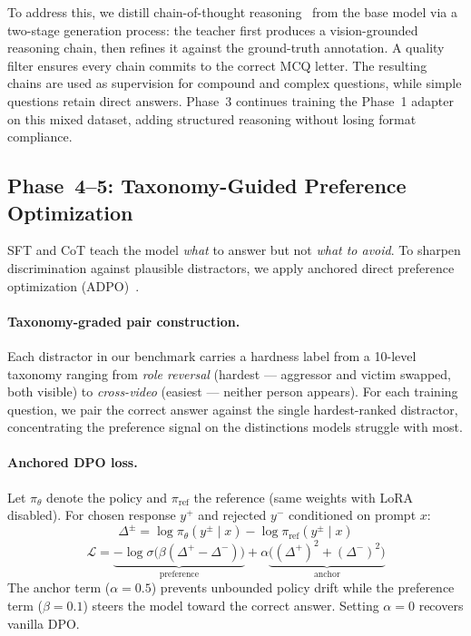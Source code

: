 To address this, we distill chain-of-thought
reasoning~\cite{wei2022chain} from the base model via a two-stage
generation process: the teacher first produces a vision-grounded reasoning
chain, then refines it against the ground-truth annotation.
A quality filter ensures every chain commits to the correct MCQ letter.
The resulting chains are used as supervision for compound and complex
questions, while simple questions retain direct answers.
Phase~3 continues training the Phase~1 adapter on this mixed dataset,
adding structured reasoning without losing format compliance.

\subsection{Phase~4--5: Taxonomy-Guided Preference Optimization}
\label{sec:adpo}

SFT and CoT teach the model \emph{what} to answer but not \emph{what to
avoid}.
To sharpen discrimination against plausible distractors, we apply anchored
direct preference optimization
(ADPO)~\cite{zhang2025adpo,rafailov2023direct}.

\paragraph{Taxonomy-graded pair construction.}
Each distractor in our benchmark carries a hardness label from a 10-level
taxonomy ranging from \emph{role reversal} (hardest --- aggressor and victim
swapped, both visible) to \emph{cross-video} (easiest --- neither person
appears).
For each training question, we pair the correct answer against the single
hardest-ranked distractor, concentrating the preference signal on the
distinctions models struggle with most.

\paragraph{Anchored DPO loss.}
Let $\pi_\theta$ denote the policy and $\pi_{\mathrm{ref}}$ the reference
(same weights with LoRA disabled).
For chosen response $y^+$ and rejected $y^-$ conditioned on prompt $x$:
%
\begin{equation}
  \Delta^{\pm} = \log \pi_\theta(y^{\pm} \mid x) - \log \pi_{\mathrm{ref}}(y^{\pm} \mid x)
\end{equation}
%
\begin{equation}
  \mathcal{L} = \underbrace{-\log\sigma\!\bigl(\beta(\Delta^+ - \Delta^-)\bigr)}_{\text{preference}}
              + \alpha\underbrace{\bigl((\Delta^+)^2 + (\Delta^-)^2\bigr)}_{\text{anchor}}
\end{equation}
%
The anchor term ($\alpha = 0.5$) prevents unbounded policy drift while the
preference term ($\beta = 0.1$) steers the model toward the correct answer.
Setting $\alpha = 0$ recovers vanilla DPO.
